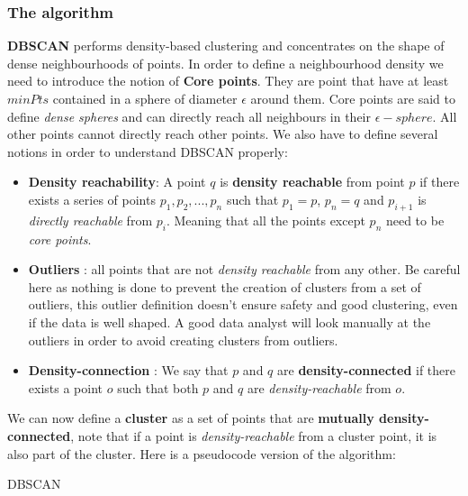 \subsubsection{The algorithm}
\textbf{DBSCAN} performs density-based clustering and concentrates on the shape of dense neighbourhoods of points. In order to define a neighbourhood density we need to introduce the notion of \textbf{Core points}. They are point that have at least $minPts$ contained in a sphere of diameter $\epsilon$ around them. Core points are said to define \emph{dense spheres} and can directly reach all neighbours in their $\epsilon - sphere$. All other points cannot directly reach other points. We also have to define several notions in order to understand DBSCAN properly: 
\begin{itemize}
\item \textbf{Density reachability}: A point $q$ is \textbf{density reachable} from point $p$ if there exists a series of points $p_{1}, p_{2},..., p_{n}$ such that $p_{1}=p$, $p_{n}=q$ and $p_{i+1}$ is \emph{directly reachable} from $p_{i}$. Meaning that all the points except $p_{n}$ need to be \emph{core points}. 
\item \textbf{Outliers} : all points that are not \emph{density reachable} from any other. Be careful here as nothing is done to prevent the creation of clusters from a set of outliers, this outlier definition doesn't ensure safety and good clustering, even if the data is well shaped. A good data analyst will look manually at the outliers in order to avoid creating clusters from outliers.
\item \textbf{Density-connection} : We say that $p$ and $q$ are \textbf{density-connected} if there exists a point $o$ such that both $p$ and $q$ are \emph{density-reachable} from $o$.
\end{itemize}
We can now define a \textbf{cluster} as a set of points that are \textbf{mutually density-connected}, note that if a point is \emph{density-reachable} from a cluster point, it is also part of the cluster.
Here is a pseudocode version of the algorithm:

\begin{algorithm}[H]
\SetAlgoLined
{}
\caption{DBSCAN}
\end{algorithm}




